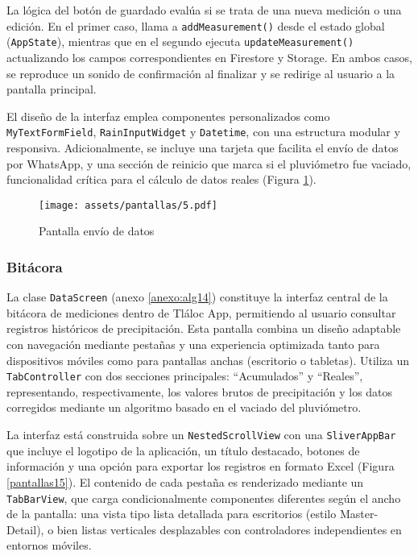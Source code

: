 La lógica del botón de guardado evalúa si se trata de una nueva medición o una edición. En el primer caso, llama a \texttt{addMeasurement()} desde el estado global (\texttt{AppState}), mientras que en el segundo ejecuta \texttt{updateMeasurement()} actualizando los campos correspondientes en Firestore y Storage. En ambos casos, se reproduce un sonido de confirmación al finalizar y se redirige al usuario a la pantalla principal.

El diseño de la interfaz emplea componentes personalizados como \texttt{MyTextFormField}, \texttt{RainInputWidget} y \texttt{Datetime}, con una estructura modular y responsiva. Adicionalmente, se incluye una tarjeta que facilita el envío de datos por WhatsApp, y una sección de reinicio que marca si el pluviómetro fue vaciado, funcionalidad crítica para el cálculo de datos reales (Figura \ref{pantallas5}).

\begin{figure}[h!]
\centering
  \texttt{[image: assets/pantallas/5.pdf]}
  \caption{Pantalla envío de datos}
  \label{pantallas5}
\end{figure}



\newpage
\subsubsection*{Bitácora}

La clase \texttt{DataScreen}  (anexo \ref{anexo:alg14}) constituye la interfaz central de la bitácora de mediciones dentro de Tláloc App, permitiendo al usuario consultar registros históricos de precipitación. Esta pantalla combina un diseño adaptable con navegación mediante pestañas y una experiencia optimizada tanto para dispositivos móviles como para pantallas anchas (escritorio o tabletas). Utiliza un \texttt{TabController} con dos secciones principales: ``Acumulados'' y ``Reales'', representando, respectivamente, los valores brutos de precipitación y los datos corregidos mediante un algoritmo basado en el vaciado del pluviómetro.

La interfaz está construida sobre un \texttt{NestedScrollView} con una \texttt{SliverAppBar} que incluye el logotipo de la aplicación, un título destacado, botones de información y una opción para exportar los registros en formato Excel (Figura \ref{pantallas15}). El contenido de cada pestaña es renderizado mediante un \texttt{TabBarView}, que carga condicionalmente componentes diferentes según el ancho de la pantalla: una vista tipo lista detallada para escritorios (estilo Master-Detail), o bien listas verticales desplazables con controladores independientes en entornos móviles.

